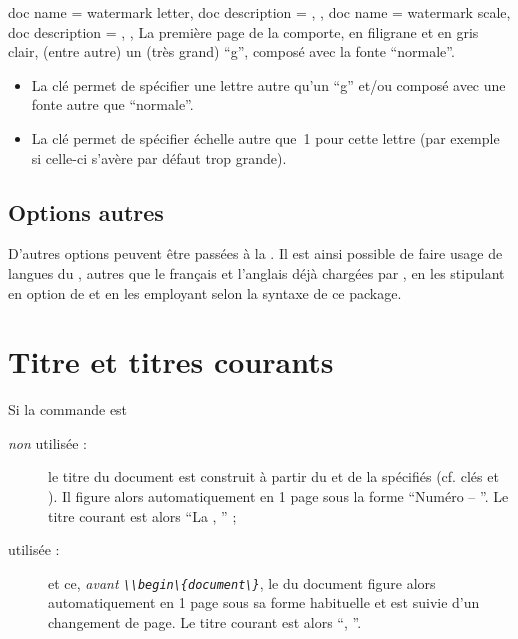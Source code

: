 \documentclass{letgut}
\begin{document}
\begin{docKeys}[doc new={2024-10-07}]
  {
    {
      doc name = watermark letter,
      doc description = {\valinitdef[g]},
    },
    {
      doc name = watermark scale,
      doc description = {\valinitdef[1]},
    },
  }%
  La première page de la  comporte, en filigrane et en gris clair,
  (entre autre) un (très grand) \enquote{g}, composé avec la fonte
  \enquote{normale}.
  \begin{itemize}
  \item La clé  permet de spécifier une lettre autre
    qu'un \enquote{g} et/ou composé avec une fonte autre que \enquote{normale}.
  \item La clé  permet de spécifier échelle autre que~1
    pour cette lettre (par exemple si celle-ci s'avère par défaut trop grande).
  \end{itemize}
\end{docKeys}

\subsection{Options autres}
\label{sec:options-autres}

D'autres options peuvent être passées à la . Il est ainsi possible
de faire usage de langues du , autres que le français et
l'anglais déjà chargées par , en les stipulant en option de
 et en les employant selon la syntaxe de ce
package.

\section{Titre et titres courants}
\label{sec:titre}
Si la commande  est
\begin{description}
\item[\emph{non} utilisée :] le titre du document est construit à partir du
   et de la  spécifiés (cf. clés  et
  ). Il figure alors automatiquement en 1\iere{} page sous la forme
  \enquote{Numéro  -- }. Le titre courant est alors
  \enquote{La , } ;
\item[ utilisée\footnotemark{} :]  et
  ce, \emph{avant \lstinline+\\begin\{document\}+}, le  du document
  figure alors automatiquement en 1\iere{} page sous sa forme habituelle et est
  suivie d'un changement de page. Le titre courant est alors
  \enquote{, }.
\end{description}
\end{document}
